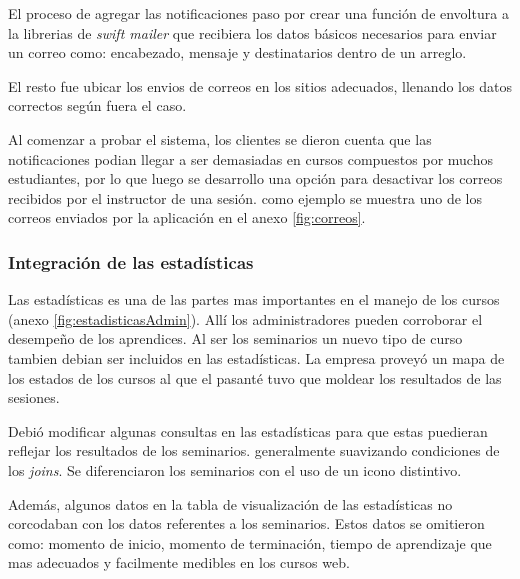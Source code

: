 El proceso de agregar las notificaciones paso por crear una función de envoltura a la librerias de \emph{swift mailer} que recibiera los datos básicos necesarios para enviar un correo como: encabezado, mensaje y destinatarios dentro de un arreglo.

El resto fue ubicar los envios de correos en los sitios adecuados, llenando los datos correctos según fuera el caso.

Al comenzar a probar el sistema, los clientes se dieron cuenta que las notificaciones podian llegar a ser demasiadas en cursos compuestos por muchos estudiantes, por lo que luego se desarrollo una opción para desactivar los correos recibidos por el instructor de una sesión. como ejemplo se muestra uno de los correos enviados por la aplicación en el anexo \ref{fig:correos}.

\subsubsection{Integración de las estadísticas}

Las estadísticas es una de las partes mas importantes en el manejo de los cursos (anexo \ref{fig:estadisticasAdmin}). Allí los administradores pueden corroborar el desempeño de los aprendices. Al ser los seminarios un nuevo tipo de curso tambien debian ser incluidos en las estadísticas. La empresa proveyó un mapa de los estados de los cursos al que el pasanté tuvo que moldear los resultados de las sesiones. 

Debió modificar algunas consultas en las estadísticas para que estas puedieran reflejar los resultados de los seminarios. generalmente suavizando condiciones de los \emph{joins}. Se diferenciaron los seminarios con el uso de un icono distintivo.

Además, algunos datos en la tabla de visualización de las estadísticas no corcodaban con los datos referentes a los seminarios. Estos datos se omitieron como: momento de inicio, momento de terminación, tiempo de aprendizaje que mas adecuados y facilmente medibles en los cursos web.


